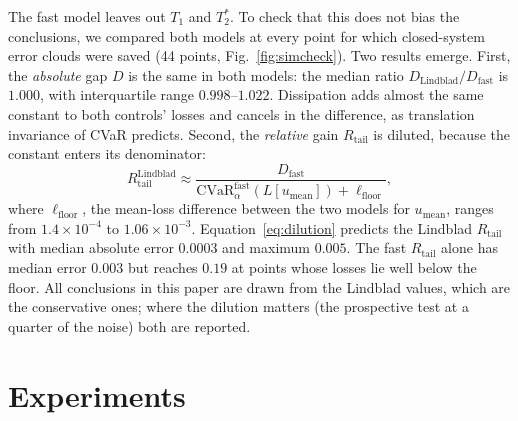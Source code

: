 \documentclass[aps,pra,onecolumn,notitlepage,superscriptaddress,nofootinbib,floatfix]{revtex4-2}
\newcommand{\cvar}{\mathrm{CVaR}}
\newcommand{\Rt}{R_{\mathrm{tail}}}
\newcommand{\umean}{u_{\mathrm{mean}}}
\begin{document}
The fast model leaves out $T_1$ and $T_2^*$. To check that this does not bias
the conclusions, we compared both models at every point for which
closed-system error clouds were saved (44 points, Fig.~\ref{fig:simcheck}).
Two results emerge. First, the \emph{absolute} gap $D$ is the same in both
models: the median ratio $D_{\mathrm{Lindblad}}/D_{\mathrm{fast}}$ is $1.000$,
with interquartile range $0.998$--$1.022$. Dissipation adds almost the same
constant to both controls' losses and cancels in the difference, as
translation invariance of CVaR predicts. Second, the \emph{relative} gain
$\Rt$ is diluted, because the constant enters its denominator:
\begin{equation}
\Rt^{\mathrm{Lindblad}}\approx\frac{D_{\mathrm{fast}}}{\cvar_{\alpha}^{\mathrm{fast}}(L[\umean])+\ell_{\mathrm{floor}}} ,
\label{eq:dilution}
\end{equation}
where $\ell_{\mathrm{floor}}$, the mean-loss difference between the two
models for $\umean$, ranges from $1.4\times10^{-4}$ to $1.06\times10^{-3}$.
Equation~\eqref{eq:dilution} predicts the Lindblad $\Rt$ with median absolute
error $0.0003$ and maximum $0.005$. The fast $\Rt$ alone has median error
$0.003$ but reaches $0.19$ at points whose losses lie well below the floor.
All conclusions in this paper are drawn from the Lindblad values, which are
the conservative ones; where the dilution matters (the prospective test at a
quarter of the noise) both are reported.


\section{Experiments}
\label{sec:experiments}
\end{document}
